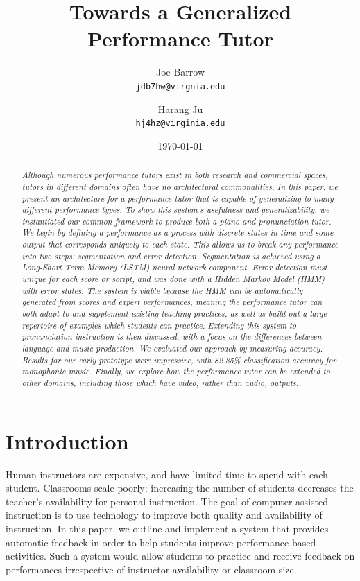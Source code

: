 \documentclass[twocolumn]{article}
\title{Towards a Generalized Performance Tutor}
\author{
  Joe Barrow\\
  \texttt{jdb7hw@virgnia.edu}
  \and
  Harang Ju\\
  \texttt{hj4hz@virginia.edu}}
\date{\today}
\begin{document}
\maketitle

\begin{abstract}

\textit{Although numerous performance tutors exist in both research and commercial spaces, tutors in different domains often have no architectural commonalities. In this paper, we present an architecture for a performance tutor that is capable of generalizing to many different performance types. To show this system’s usefulness and generalizability, we instantiated our common framework to produce both a piano and pronunciation tutor. We begin by defining a performance as a process with discrete states in time and some output that corresponds uniquely to each state. This allows us to break any performance into two steps: segmentation and error detection. Segmentation is achieved using a Long-Short Term Memory (LSTM) neural network component. Error detection must unique for each score or script, and was done with a Hidden Markov Model (HMM) with error states. The system is viable because the HMM can be automatically generated from scores and expert performances, meaning the performance tutor can both adapt to and supplement existing teaching practices, as well as build out a large repertoire of examples which students can practice. Extending this system to pronunciation instruction is then discussed, with a focus on the differences between language and music production. We evaluated our approach by measuring accuracy. Results for our early prototype were impressive, with 82.85\% classification accuracy for monophonic music. Finally, we explore how the performance tutor can be extended to other domains, including those which have video, rather than audio, outputs.}

\end{abstract}

\section{Introduction}

Human instructors are expensive, and have limited time to spend with each student. Classrooms scale poorly; increasing the number of students decreases the teacher's availability for personal instruction. The goal of computer-assisted instruction is to use technology to improve both quality and availability of instruction. In this paper, we outline and implement a system that provides automatic feedback in order to help students improve performance-based activities. Such a system would allow students to practice and receive feedback on performances irrespective of instructor availability or classroom size.
\end{document}
